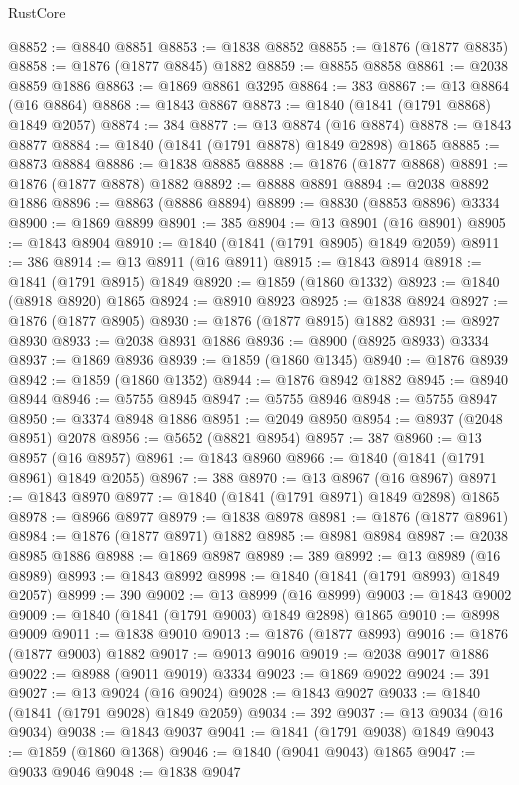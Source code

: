 \begin{lexlean}{RustCore}
\begin{coremodule}
@8852 := @8840 @8851
@8853 := @1838 @8852
@8855 := @1876 (@1877 @8835)
@8858 := @1876 (@1877 @8845) @1882
@8859 := @8855 @8858
@8861 := @2038 @8859 @1886
@8863 := @1869 @8861 @3295
@8864 := 383
@8867 := @13 @8864 (@16 @8864)
@8868 := @1843 @8867
@8873 := @1840 (@1841 (@1791 @8868) @1849 @2057)
@8874 := 384
@8877 := @13 @8874 (@16 @8874)
@8878 := @1843 @8877
@8884 := @1840 (@1841 (@1791 @8878) @1849 @2898) @1865
@8885 := @8873 @8884
@8886 := @1838 @8885
@8888 := @1876 (@1877 @8868)
@8891 := @1876 (@1877 @8878) @1882
@8892 := @8888 @8891
@8894 := @2038 @8892 @1886
@8896 := @8863 (@8886 @8894)
@8899 := @8830 (@8853 @8896) @3334
@8900 := @1869 @8899
@8901 := 385
@8904 := @13 @8901 (@16 @8901)
@8905 := @1843 @8904
@8910 := @1840 (@1841 (@1791 @8905) @1849 @2059)
@8911 := 386
@8914 := @13 @8911 (@16 @8911)
@8915 := @1843 @8914
@8918 := @1841 (@1791 @8915) @1849
@8920 := @1859 (@1860 @1332)
@8923 := @1840 (@8918 @8920) @1865
@8924 := @8910 @8923
@8925 := @1838 @8924
@8927 := @1876 (@1877 @8905)
@8930 := @1876 (@1877 @8915) @1882
@8931 := @8927 @8930
@8933 := @2038 @8931 @1886
@8936 := @8900 (@8925 @8933) @3334
@8937 := @1869 @8936
@8939 := @1859 (@1860 @1345)
@8940 := @1876 @8939
@8942 := @1859 (@1860 @1352)
@8944 := @1876 @8942 @1882
@8945 := @8940 @8944
@8946 := @5755 @8945
@8947 := @5755 @8946
@8948 := @5755 @8947
@8950 := @3374 @8948 @1886
@8951 := @2049 @8950
@8954 := @8937 (@2048 @8951) @2078
@8956 := @5652 (@8821 @8954)
@8957 := 387
@8960 := @13 @8957 (@16 @8957)
@8961 := @1843 @8960
@8966 := @1840 (@1841 (@1791 @8961) @1849 @2055)
@8967 := 388
@8970 := @13 @8967 (@16 @8967)
@8971 := @1843 @8970
@8977 := @1840 (@1841 (@1791 @8971) @1849 @2898) @1865
@8978 := @8966 @8977
@8979 := @1838 @8978
@8981 := @1876 (@1877 @8961)
@8984 := @1876 (@1877 @8971) @1882
@8985 := @8981 @8984
@8987 := @2038 @8985 @1886
@8988 := @1869 @8987
@8989 := 389
@8992 := @13 @8989 (@16 @8989)
@8993 := @1843 @8992
@8998 := @1840 (@1841 (@1791 @8993) @1849 @2057)
@8999 := 390
@9002 := @13 @8999 (@16 @8999)
@9003 := @1843 @9002
@9009 := @1840 (@1841 (@1791 @9003) @1849 @2898) @1865
@9010 := @8998 @9009
@9011 := @1838 @9010
@9013 := @1876 (@1877 @8993)
@9016 := @1876 (@1877 @9003) @1882
@9017 := @9013 @9016
@9019 := @2038 @9017 @1886
@9022 := @8988 (@9011 @9019) @3334
@9023 := @1869 @9022
@9024 := 391
@9027 := @13 @9024 (@16 @9024)
@9028 := @1843 @9027
@9033 := @1840 (@1841 (@1791 @9028) @1849 @2059)
@9034 := 392
@9037 := @13 @9034 (@16 @9034)
@9038 := @1843 @9037
@9041 := @1841 (@1791 @9038) @1849
@9043 := @1859 (@1860 @1368)
@9046 := @1840 (@9041 @9043) @1865
@9047 := @9033 @9046
@9048 := @1838 @9047

\end{coremodule}
\end{lexlean}
